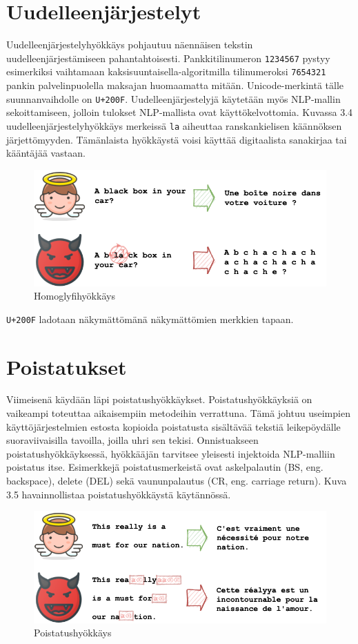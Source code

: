 \section{Uudelleenjärjestelyt}
Uudelleenjärjestelyhyökkäys pohjautuu näennäisen tekstin uudelleenjärjestämiseen pahantahtoisesti. Pankkitilinumeron \texttt{1234567} pystyy esimerkiksi vaihtamaan kaksisuuntaisella-algoritmilla tilinumeroksi \texttt{7654321} pankin palvelinpuolella maksajan huomaamatta mitään. Unicode-merkintä tälle suunnanvaihdolle on \texttt{U+200F}. Uudelleenjärjestelyjä käytetään myös NLP-mallin sekoittamiseen, jolloin tulokset NLP-mallista ovat käyttökelvottomia. Kuvassa 3.4 uudelleenjärjestelyhyökkäys merkeissä \texttt{la} aiheuttaa ranskankielisen käännöksen järjettömyyden. Tämänlaista hyökkäystä voisi käyttää digitaalista sanakirjaa tai kääntäjää vastaan. \citep{boucher2021bad}
\begin{figure}[t]
  \includegraphics[scale=0.5]{figures/reordering.png}
  \caption{Homoglyfihyökkäys \citep{boucher2021bad}}
\end{figure}
\texttt{U+200F} ladotaan näkymättömänä näkymättömien merkkien tapaan.

\section{Poistatukset}

Viimeisenä käydään läpi poistatushyökkäykset. Poistatushyökkäyksiä on vaikeampi toteuttaa aikaisempiin metodeihin verrattuna. Tämä johtuu useimpien käyttöjärjestelmien estosta kopioida poistatusta sisältävää tekstiä leikepöydälle suoraviivaisilla tavoilla, joilla uhri sen tekisi. Onnistuakseen poistatushyökkäyksessä, hyökkääjän tarvitsee yleisesti injektoida NLP-malliin poistatus itse. Esimerkkejä poistatusmerkeistä ovat askelpalautin (BS, eng. backspace), delete (DEL) sekä vaununpalautus (CR, eng. carriage return). \citep{boucher2021bad}
Kuva 3.5 havainnollistaa poistatushyökkäystä käytännössä.
\begin{figure}[t]
  \includegraphics[scale=0.5]{figures/backspace.png}
  \caption{Poistatushyökkäys \citep{boucher2021bad}}
\end{figure}